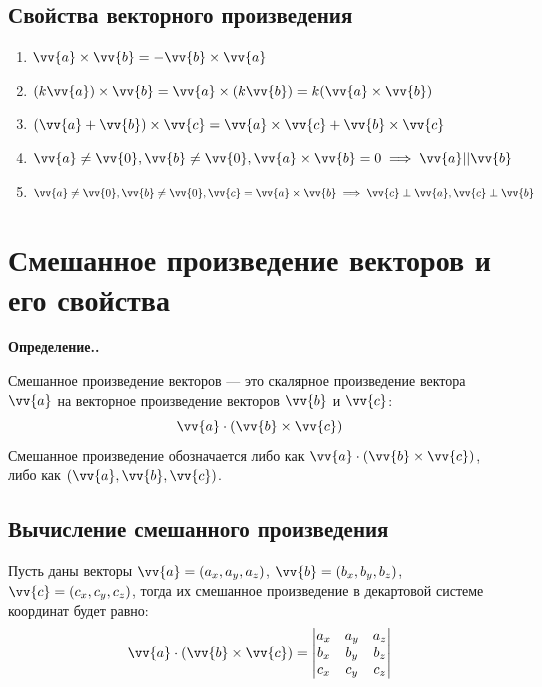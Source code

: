 \documentclass[a4paper,12pt,oneside]{extbook}
\newcommand{\newpar}{$ $\par\nobreak\ignorespaces}
\newenvironment{definition}[1][]{\noindent\textbf{Определение.\if\relax\detokenize{#1}\relax\else\;#1.\fi}\newpar}{\bigskip}
\theoremstyle{numbered}
\theoremstyle{unnumbered}
\theoremstyle{named}
\theoremstyle{unnumbered}
\theoremstyle{named}
\theoremstyle{named}
\theoremstyle{named}
\begin{document}
\subsection{Свойства векторного произведения}%
\label{sub:Свойства векторного произведения}

\begin{enumerate}
    \item {\(\vv{a} \times \vv{b} = - \vv{b} \times \vv{a}\)}

    \item {\((k \vv{a}) \times \vv{b} = \vv{a} \times (k \vv{b}) = k(\vv{a} \times \vv{b})\)}

    \item {\((\vv{a} + \vv{b}) \times \vv{c} = \vv{a} \times \vv{c} + \vv{b} \times \vv{c}\)}

    \item {\(\vv{a} \neq \vv{0}, \vv{b} \neq \vv{0}, \vv{a} \times \vv{b} = 0 \implies \vv{a} || \vv{b}\)}

    \item {\(\vv{a} \neq \vv{0}, \vv{b} \neq \vv{0}, \vv{c} = \vv{a} \times \vv{b} \implies \vv{c} \perp \vv{a}, \vv{c} \perp \vv{b} \)}
\end{enumerate}

\section{Смешанное произведение векторов и его свойства}%
\label{sec:Смешанное произведение векторов и его свойства}

\begin{definition}
    Смешанное произведение векторов — это скалярное произведение вектора \(\vv{a}\) на векторное произведение векторов \(\vv{b}\) и \(\vv{c}\):
    \[
        \vv{a} \cdot (\vv{b} \times \vv{c})
    \]
    Смешанное произведение обозначается либо как \(\vv{a} \cdot (\vv{b} \times \vv{c})\), либо как \((\vv{a}, \vv{b}, \vv{c})\).
\end{definition}

\subsection{Вычисление смешанного произведения}%
\label{sub:Вычисление смешанного произведения}

Пусть даны векторы \(\vv{a} = (a_x, a_y, a_z)\), \(\vv{b} = (b_x, b_y, b_z)\), \(\vv{c} = (c_x, c_y, c_z)\), тогда их смешанное произведение в декартовой системе координат будет равно:
\[
    \vv{a} \cdot (\vv{b} \times \vv{c}) =
    \begin{vmatrix}
        a_x & a_y & a_z \\
        b_x & b_y & b_z \\
        c_x & c_y & c_z
    \end{vmatrix}
\]
\end{document}
